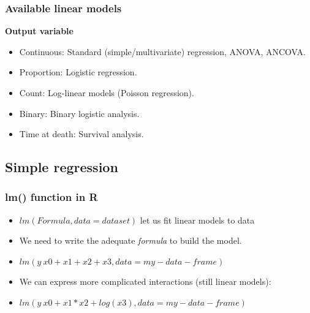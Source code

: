 
\begin{frame}
\frametitle{Available linear models}

\textbf{Output variable}
\begin{itemize}
\item Continuous: Standard (simple/multivariate) regression, ANOVA, ANCOVA.
\item Proportion: Logistic regression.
\item Count: Log-linear models (Poisson regression).
\item Binary: Binary logistic analysis.
\item Time at death: Survival analysis.
\end{itemize}

\end{frame}

\subsection{Simple regression}


\begin{frame}
\frametitle{lm() function in R}

\begin{itemize}
 \item $lm(Formula, data = dataset)$ let us fit linear models to data
 \item We need to write the adequate \textit{formula} to build the model.
 \item $lm(y ~ x0 + x1 + x2 + x3, data = my-data-frame)$
 \item We can express more complicated interactions (still linear models):
 \item $lm(y ~ x0 + x1*x2 + log(x3), data = my-data-frame)$

\end{itemize}
\end{frame}


% 
% 

